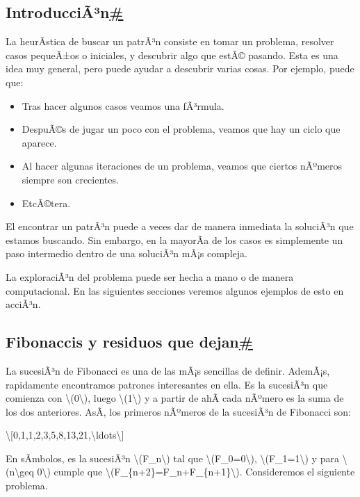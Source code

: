 \documentclass[
]{article}
\begin{document}
\label{introduccion}
\subsection{\texorpdfstring{IntroducciÃ³n\hyperref[introduccion]{\#}}{IntroducciÃ³n\#}}\label{introducciuxe3uxb3n}

La heurÃ­stica de buscar un patrÃ³n consiste en tomar un problema,
resolver casos pequeÃ±os o iniciales, y descubrir algo que estÃ©
pasando. Esta es una idea muy general, pero puede ayudar a descubrir
varias cosas. Por ejemplo, puede que:

\begin{itemize}
\item
  Tras hacer algunos casos veamos una fÃ³rmula.
\item
  DespuÃ©s de jugar un poco con el problema, veamos que hay un ciclo que
  aparece.
\item
  Al hacer algunas iteraciones de un problema, veamos que ciertos
  nÃºmeros siempre son crecientes.
\item
  EtcÃ©tera.
\end{itemize}

El encontrar un patrÃ³n puede a veces dar de manera inmediata la
soluciÃ³n que estamos buscando. Sin embargo, en la mayorÃ­a de los casos
es simplemente un paso intermedio dentro de una soluciÃ³n mÃ¡s compleja.

La exploraciÃ³n del problema puede ser hecha a mano o de manera
computacional. En las siguientes secciones veremos algunos ejemplos de
esto en acciÃ³n.

\subsection{\texorpdfstring{Fibonaccis y residuos que
dejan\hyperref[fibonaccis-y-residuos-que-dejan]{\#}}{Fibonaccis y residuos que dejan\#}}\label{fibonaccis-y-residuos-que-dejan}

La sucesiÃ³n de Fibonacci es una de las mÃ¡s sencillas de definir.
AdemÃ¡s, rapidamente encontramos patrones interesantes en ella. Es la
sucesiÃ³n que comienza con {\textbackslash(0\textbackslash)}, luego
{\textbackslash(1\textbackslash)} y a partir de ahÃ­ cada nÃºmero es la
suma de los dos anteriores. AsÃ­, los primeros nÃºmeros de la sucesiÃ³n
de Fibonacci son:

\textbackslash{[}0,1,1,2,3,5,8,13,21,\textbackslash ldots\textbackslash{]}

En sÃ­mbolos, es la sucesiÃ³n {\textbackslash(F\_n\textbackslash)} tal
que {\textbackslash(F\_0=0\textbackslash)},
{\textbackslash(F\_1=1\textbackslash)} y para
{\textbackslash(n\textbackslash geq 0\textbackslash)} cumple que
{\textbackslash(F\_\{n+2\}=F\_n+F\_\{n+1\}\textbackslash)}. Consideremos
el siguiente problema.
\end{document}
